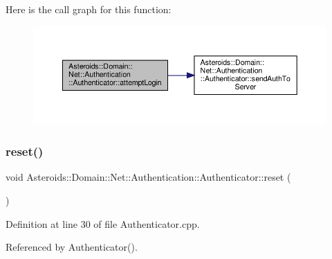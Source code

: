 Here is the call graph for this function\+:\nopagebreak
\begin{figure}[H]
\begin{center}
\leavevmode
\includegraphics[width=350pt]{classAsteroids_1_1Domain_1_1Net_1_1Authentication_1_1Authenticator_a1dd2c0964bae0658b8477c7d041f62d5_cgraph}
\end{center}
\end{figure}
\mbox{\label{classAsteroids_1_1Domain_1_1Net_1_1Authentication_1_1Authenticator_adcb0d071c190cabc1333ab81ae2c9650}} 
\subsubsection{\texorpdfstring{reset()}{reset()}}
{\footnotesize\ttfamily void Asteroids\+::\+Domain\+::\+Net\+::\+Authentication\+::\+Authenticator\+::reset (\begin{DoxyParamCaption}{ }\end{DoxyParamCaption})}



Definition at line 30 of file Authenticator.\+cpp.



Referenced by Authenticator().


